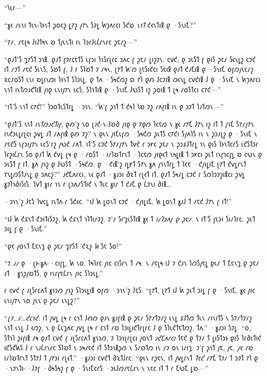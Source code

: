 “𐑘𐑧𐑩—”

“𐑣𐑬 𐑥𐑧𐑯𐑦 𐑑𐑧𐑯-𐑐𐑶𐑯𐑑 𐑜𐑴𐑤𐑟 𐑛𐑳𐑟 𐑢𐑳𐑯 𐑕𐑲𐑛 𐑿𐑠𐑵𐑩𐑤𐑦 𐑕𐑒𐑹 \emph{𐑯𐑪𐑑} 𐑒𐑬𐑯𐑑𐑦𐑙 𐑞 ·𐑕𐑯𐑦𐑗?”

“𐑳𐑥, 𐑥𐑱𐑚𐑰 𐑓𐑦𐑓𐑑𐑰𐑯 𐑹 𐑑𐑢𐑧𐑯𐑑𐑦 𐑦𐑯 𐑐𐑮𐑩𐑓𐑧𐑖𐑩𐑯𐑩𐑤 𐑜𐑱𐑥𐑟—”

“𐑞𐑨𐑑'𐑕 𐑡𐑳𐑕𐑑 𐑮𐑪𐑙. 𐑞𐑨𐑑 𐑝𐑲𐑩𐑤𐑱𐑑𐑕 𐑧𐑝𐑮𐑦 𐑐𐑪𐑕𐑩𐑚𐑩𐑤 𐑮𐑵𐑤 𐑝 𐑜𐑱𐑥 𐑛𐑦𐑟𐑲𐑯. 𐑤𐑫𐑒, 𐑞 𐑮𐑧𐑕𐑑 𐑝 𐑞𐑦𐑕 𐑜𐑱𐑥 𐑕𐑬𐑯𐑛𐑟 𐑤𐑲𐑒 𐑦𐑑 𐑥𐑲𐑑 𐑥𐑱𐑒 𐑕𐑧𐑯𐑕, 𐑕𐑹𐑑 𐑝, 𐑓 𐑩 𐑕𐑐𐑹𐑑 𐑲 𐑥𐑰𐑯, 𐑚𐑳𐑑 𐑿'𐑼 𐑚𐑱𐑕𐑦𐑒𐑤𐑦 𐑕𐑱𐑦𐑙 𐑞𐑨𐑑 𐑒𐑨𐑗𐑦𐑙 𐑞 ·𐑕𐑯𐑦𐑗 𐑴𐑝𐑼𐑢𐑧𐑤𐑥𐑟 𐑷𐑤𐑥𐑴𐑕𐑑 𐑧𐑯𐑦 𐑹𐑛𐑦𐑯𐑼𐑦 𐑐𐑶𐑯𐑑 𐑕𐑐𐑮𐑧𐑛. 𐑞 𐑑𐑵 ·𐑕𐑰𐑒𐑼𐑟 𐑸 𐑳𐑐 𐑞𐑺 𐑓𐑤𐑲𐑦𐑙 𐑼𐑬𐑯𐑛 𐑤𐑫𐑒𐑦𐑙 𐑓 𐑞 ·𐑕𐑯𐑦𐑗 𐑯 𐑿𐑠𐑵𐑩𐑤𐑦 𐑯𐑪𐑑 𐑦𐑯𐑑𐑼𐑨𐑒𐑑𐑦𐑙 𐑢𐑦𐑞 𐑧𐑯𐑦𐑢𐑳𐑯 𐑧𐑤𐑕, 𐑕𐑐𐑪𐑑𐑦𐑙 𐑞 ·𐑕𐑯𐑦𐑗 𐑓𐑻𐑕𐑑 𐑦𐑟 𐑜𐑴𐑦𐑙 𐑑 𐑚𐑰 𐑥𐑴𐑕𐑑𐑤𐑦 𐑤𐑳𐑒—”

“𐑦𐑑'𐑕 𐑯𐑪𐑑 𐑤𐑳𐑒!” 𐑐𐑮𐑴𐑑𐑧𐑕𐑑𐑩𐑛 ·𐑮𐑪𐑯. “𐑿'𐑝 𐑜𐑪𐑑 𐑑 𐑒𐑰𐑐 𐑘𐑹 𐑲𐑟 𐑥𐑵𐑝𐑦𐑙 𐑦𐑯 𐑞 𐑮𐑲𐑑 𐑐𐑨𐑑𐑼𐑯—”

“𐑞𐑨𐑑'𐑕 𐑯𐑪𐑑 \emph{𐑦𐑯𐑑𐑼𐑨𐑒𐑑𐑦𐑝}, 𐑞𐑺'𐑟 𐑯𐑴 𐑚𐑨𐑒-𐑯-𐑓𐑹𐑔 𐑢𐑦𐑞 𐑞 𐑳𐑞𐑼 𐑐𐑤𐑱𐑼 𐑯 𐑣𐑬 𐑥𐑳𐑗 𐑓𐑳𐑯 𐑦𐑟 𐑦𐑑 𐑑 𐑢𐑪𐑗 𐑕𐑳𐑥𐑢𐑳𐑯 𐑦𐑯𐑒𐑮𐑧𐑛𐑩𐑚𐑤𐑦 𐑜𐑫𐑛 𐑨𐑑 𐑥𐑵𐑝𐑦𐑙 𐑞𐑺 𐑲𐑟? 𐑯 𐑞𐑧𐑯 𐑢𐑦𐑗𐑧𐑝𐑼 ·𐑕𐑰𐑒𐑼 𐑜𐑧𐑑𐑕 𐑤𐑳𐑒𐑦 𐑕𐑢𐑵𐑐𐑕 𐑦𐑯 𐑯 𐑜𐑮𐑨𐑚𐑟 𐑞 ·𐑕𐑯𐑦𐑗 𐑯 𐑥𐑱𐑒𐑕 𐑧𐑝𐑮𐑦𐑢𐑳𐑯 𐑧𐑤𐑕'𐑩𐑟 𐑢𐑻𐑒 𐑥𐑵𐑑. 𐑦𐑑'𐑕 𐑤𐑲𐑒 𐑕𐑳𐑥𐑢𐑳𐑯 𐑑𐑫𐑒 𐑩 𐑮𐑾𐑤 𐑜𐑱𐑥 𐑯 𐑜𐑮𐑭𐑓𐑑𐑩𐑛 𐑪𐑯 𐑞𐑦𐑕 𐑐𐑶𐑯𐑑𐑤𐑩𐑕 𐑧𐑒𐑕𐑑𐑮𐑩 𐑐𐑩𐑟𐑦𐑖𐑩𐑯 𐑕𐑴 𐑞𐑨𐑑 𐑿 𐑒𐑫𐑛 𐑚𐑰 𐑞 ·𐑥𐑴𐑕𐑑 ·𐑦𐑥𐑐𐑹𐑑𐑩𐑯𐑑 ·𐑐𐑤𐑱𐑼 𐑢𐑦𐑞𐑬𐑑 𐑯𐑰𐑛𐑦𐑙 𐑑 𐑮𐑾𐑤𐑦 𐑜𐑧𐑑 𐑦𐑯𐑝𐑪𐑤𐑝𐑛 𐑹 𐑤𐑻𐑯 𐑞 𐑮𐑧𐑕𐑑 𐑝 𐑦𐑑. 𐑣𐑵 𐑢𐑪𐑟 𐑞 𐑓𐑻𐑕𐑑 ·𐑕𐑰𐑒𐑼, 𐑞 ·𐑒𐑦𐑙'𐑟 𐑦𐑛𐑾𐑑 𐑕𐑳𐑯 𐑣𐑵 𐑢𐑪𐑯𐑑𐑩𐑛 𐑑 𐑐𐑤𐑱 ·𐑒𐑢𐑦𐑛𐑦𐑗 𐑚𐑳𐑑 𐑒𐑫𐑛𐑩𐑯𐑑 𐑳𐑯𐑛𐑼𐑕𐑑𐑨𐑯𐑛 𐑞 𐑮𐑵𐑤𐑟?” 𐑨𐑒𐑗𐑵𐑩𐑤𐑦, 𐑯𐑬 𐑞𐑨𐑑 ·𐑣𐑨𐑮𐑦 𐑔𐑷𐑑 𐑩𐑚𐑬𐑑 𐑦𐑑, 𐑞𐑨𐑑 𐑕𐑰𐑥𐑛 𐑤𐑲𐑒 𐑩 𐑕𐑼𐑐𐑮𐑲𐑟𐑦𐑙𐑤𐑦 𐑜𐑫𐑛 𐑣𐑲𐑐𐑪𐑔𐑦𐑕𐑦𐑕. 𐑐𐑫𐑑 𐑣𐑦𐑥 𐑪𐑯 𐑩 𐑚𐑮𐑵𐑥𐑕𐑑𐑦𐑒 𐑯 𐑑𐑧𐑤 𐑣𐑦𐑥 𐑑 𐑒𐑨𐑗 𐑞 𐑖𐑲𐑯𐑦 𐑔𐑦𐑙…

·𐑮𐑪𐑯'𐑟 𐑓𐑱𐑕 𐑐𐑫𐑤𐑛 𐑦𐑯𐑑𐑵 𐑩 𐑕𐑒𐑬𐑤. “𐑦𐑓 𐑿 𐑛𐑴𐑯𐑑 𐑤𐑲𐑒 ·𐑒𐑢𐑦𐑛𐑦𐑗, 𐑿 𐑛𐑴𐑯𐑑 𐑣𐑨𐑓 𐑑 𐑥𐑱𐑒 𐑓𐑳𐑯 𐑝 𐑦𐑑!”

“𐑦𐑓 𐑿 𐑒𐑭𐑯𐑑 𐑒𐑮𐑦𐑑𐑦𐑕𐑲𐑟, 𐑿 𐑒𐑭𐑯𐑑 𐑪𐑐𐑑𐑦𐑥𐑲𐑟. 𐑲'𐑥 𐑕𐑩𐑡𐑧𐑕𐑑𐑦𐑙 𐑣𐑬 𐑑 \emph{𐑦𐑥𐑐𐑮𐑵𐑝 𐑞 𐑜𐑱𐑥}. 𐑯 𐑦𐑑'𐑕 𐑝𐑧𐑮𐑦 𐑕𐑦𐑥𐑐𐑩𐑤. 𐑜𐑧𐑑 𐑮𐑦𐑛 𐑝 𐑞 ·𐑕𐑯𐑦𐑗.”

“𐑞𐑱 𐑢𐑴𐑯𐑑 𐑗𐑱𐑯𐑡 𐑞 𐑜𐑱𐑥 𐑡𐑳𐑕𐑑 '𐑒𐑷𐑟 \emph{𐑿} 𐑕𐑱 𐑕𐑴!”

“𐑲 \emph{𐑨𐑥} 𐑞 ·𐑚𐑶-𐑣𐑵-·𐑤𐑦𐑝𐑛, 𐑿 𐑯𐑴. 𐑐𐑰𐑐𐑩𐑤 𐑢𐑦𐑤 𐑤𐑦𐑕𐑩𐑯 𐑑 𐑥𐑰. 𐑯 𐑥𐑱𐑚𐑰 𐑦𐑓 𐑲 𐑒𐑨𐑯 𐑐𐑼𐑕𐑢𐑱𐑛 𐑞𐑧𐑥 𐑑 𐑗𐑱𐑯𐑡 𐑞 𐑜𐑱𐑥 𐑨𐑑 ·𐑣𐑪𐑜𐑢𐑹𐑑𐑕, 𐑞 𐑦𐑯𐑩𐑝𐑱𐑖𐑩𐑯 𐑢𐑦𐑤 𐑕𐑐𐑮𐑧𐑛.”

𐑩 𐑤𐑫𐑒 𐑝 𐑨𐑚𐑕𐑩𐑤𐑵𐑑 𐑣𐑪𐑮𐑼 𐑢𐑪𐑟 𐑕𐑐𐑮𐑧𐑛𐑦𐑙 𐑴𐑝𐑼 ·𐑮𐑪𐑯'𐑟 𐑓𐑱𐑕. “𐑚𐑳𐑑, 𐑚𐑳𐑑 𐑦𐑓 𐑿 𐑜𐑧𐑑 𐑮𐑦𐑛 𐑝 𐑞 ·𐑕𐑯𐑦𐑗, 𐑣𐑬 𐑢𐑦𐑤 𐑧𐑯𐑦𐑢𐑳𐑯 𐑯𐑴 𐑢𐑧𐑯 𐑞 𐑜𐑱𐑥 𐑧𐑯𐑛𐑟?”

“\emph{𐑚𐑲…𐑩…𐑒𐑤𐑪𐑒.} 𐑦𐑑 𐑢𐑫𐑛 𐑚𐑰 𐑩 𐑤𐑪𐑑 𐑓𐑺𐑼 𐑞𐑨𐑯 𐑣𐑨𐑝𐑦𐑙 𐑞 𐑜𐑱𐑥 𐑕𐑳𐑥𐑑𐑲𐑥𐑟 𐑧𐑯𐑛 𐑭𐑓𐑑𐑼 𐑑𐑧𐑯 𐑥𐑦𐑯𐑦𐑑𐑕 𐑯 𐑕𐑳𐑥𐑑𐑲𐑥𐑟 𐑯𐑪𐑑 𐑧𐑯𐑛 𐑓 𐑬𐑼𐑟, 𐑯 𐑞 𐑖𐑧𐑡𐑵𐑤 𐑢𐑫𐑛 𐑚𐑰 𐑩 𐑤𐑪𐑑 𐑥𐑹 𐑐𐑮𐑦𐑛𐑦𐑒𐑑𐑩𐑚𐑩𐑤 𐑓 𐑞 𐑕𐑐𐑧𐑒𐑑𐑱𐑑𐑼𐑟, 𐑑𐑵.” ·𐑣𐑨𐑮𐑦 𐑕𐑲𐑛. “𐑴, 𐑕𐑑𐑪𐑐 𐑜𐑦𐑝𐑦𐑙 𐑥𐑰 𐑞𐑨𐑑 𐑤𐑫𐑒 𐑝 𐑨𐑚𐑕𐑩𐑤𐑵𐑑 𐑣𐑪𐑮𐑼, 𐑲 𐑐𐑮𐑪𐑚𐑩𐑚𐑤𐑦 𐑢𐑴𐑯𐑑 \emph{𐑨𐑒𐑗𐑵𐑩𐑤𐑦} 𐑑𐑱𐑒 𐑞 𐑑𐑲𐑥 𐑑 𐑛𐑦𐑕𐑑𐑮𐑶 𐑞𐑦𐑕 𐑐𐑩𐑔𐑧𐑑𐑦𐑒 𐑦𐑒𐑕𐑒𐑿𐑕 𐑓 𐑩 𐑯𐑨𐑖𐑩𐑯𐑩𐑤 𐑕𐑐𐑹𐑑 𐑯 𐑮𐑰𐑥𐑱𐑒 𐑦𐑑 𐑕𐑑𐑮𐑪𐑙𐑜𐑼 𐑯 𐑕𐑥𐑸𐑑𐑼 𐑦𐑯 𐑥𐑲 𐑴𐑯 𐑦𐑥𐑦𐑡. 𐑲'𐑝 𐑜𐑪𐑑 𐑢𐑱, 𐑢𐑱, \emph{𐑢𐑱} 𐑥𐑹 𐑦𐑥𐑐𐑹𐑑𐑩𐑯𐑑 𐑕𐑑𐑳𐑓 𐑑 𐑢𐑳𐑮𐑦 𐑩𐑚𐑬𐑑.” ·𐑣𐑨𐑮𐑦 𐑤𐑫𐑒𐑑 𐑔𐑷𐑑𐑓𐑩𐑤. “𐑞𐑧𐑯 𐑩𐑜𐑱𐑯, 𐑦𐑑 𐑢𐑫𐑛𐑩𐑯𐑑 \emph{𐑑𐑱𐑒} 𐑥𐑳𐑗 𐑑𐑲𐑥 𐑑 𐑮𐑲𐑑 𐑳𐑐 𐑞 ·𐑯𐑲𐑯𐑑𐑦-·𐑓𐑲𐑝 ·𐑔𐑰𐑕𐑰𐑟 𐑝 𐑞 ·𐑕𐑯𐑦𐑗𐑤𐑩𐑕 ·𐑮𐑧𐑓𐑼𐑥𐑱𐑖𐑩𐑯 𐑯 𐑯𐑱𐑤 𐑦𐑑 𐑑 𐑩 𐑗𐑻𐑗 𐑛𐑹—”

